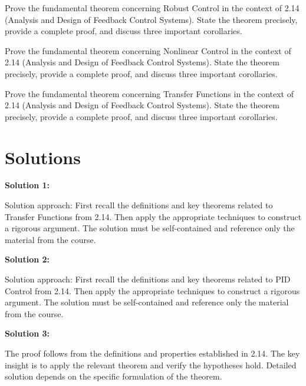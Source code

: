 \documentclass[12pt,a4paper]{exam}
\begin{document}
\begin{questions}
\question[3]
Prove the fundamental theorem concerning Robust Control in the context of 2.14 (Analysis and Design of Feedback Control Systems). State the theorem precisely, provide a complete proof, and discuss three important corollaries.

\vspace{0.3cm}

\question[4]
Prove the fundamental theorem concerning Nonlinear Control in the context of 2.14 (Analysis and Design of Feedback Control Systems). State the theorem precisely, provide a complete proof, and discuss three important corollaries.

\vspace{0.3cm}

\question[4]
Prove the fundamental theorem concerning Transfer Functions in the context of 2.14 (Analysis and Design of Feedback Control Systems). State the theorem precisely, provide a complete proof, and discuss three important corollaries.

\vspace{0.3cm}

\end{questions}

\newpage
\section*{Solutions}

\textbf{Solution 1:}

Solution approach: First recall the definitions and key theorems related to Transfer Functions from 2.14. Then apply the appropriate techniques to construct a rigorous argument. The solution must be self-contained and reference only the material from the course.

\vspace{0.5cm}

\textbf{Solution 2:}

Solution approach: First recall the definitions and key theorems related to PID Control from 2.14. Then apply the appropriate techniques to construct a rigorous argument. The solution must be self-contained and reference only the material from the course.

\vspace{0.5cm}

\textbf{Solution 3:}

The proof follows from the definitions and properties established in 2.14. The key insight is to apply the relevant theorem and verify the hypotheses hold. Detailed solution depends on the specific formulation of the theorem.
\end{document}
